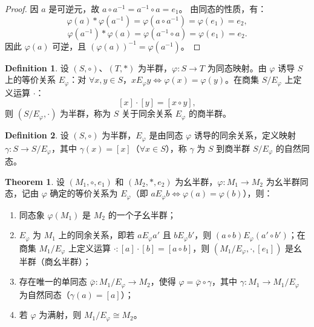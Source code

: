\documentclass[oneside]{book}
\theoremstyle{definition}
\newtheorem{definition}{Definition}[section]
\newtheorem{theorem}{Theorem}[section]
\begin{document}
\begin{proof}
	因 \( a \) 是可逆元，故 \( a \circ a^{-1} = a^{-1} \circ a = e_1 \)。
	由同态的性质，有：
	\[
	\varphi(a) * \varphi(a^{-1}) = \varphi(a \circ a^{-1}) = \varphi(e_1) = e_2,
	\]
	\[
	\varphi(a^{-1}) * \varphi(a) = \varphi(a^{-1} \circ a) = \varphi(e_1) = e_2.
	\]
	因此 \( \varphi(a) \) 可逆，且 \( (\varphi(a))^{-1} = \varphi(a^{-1}) \)。
\end{proof}

\begin{definition}
	设 \( (S, \circ) \)、\( (T, *) \) 为半群，\( \varphi: S \to T \) 为同态映射。由 \( \varphi \) 诱导 \( S \) 上的等价关系 \( E_\varphi \)：对 \( \forall x, y \in S \)，\( x E_\varphi y \iff \varphi(x) = \varphi(y) \)。在商集 \( S/E_\varphi \) 上定义运算 \( \cdot \)：
	\[
	[x] \cdot [y] = [x \circ y],
	\]
	则 \( (S/E_\varphi, \cdot) \) 为半群，称为 \( S \) 关于同余关系 \( E_\varphi \) 的商半群。
\end{definition}

\begin{definition}
	设 \( (S, \circ) \) 为半群，\( E_\varphi \) 是由同态 \( \varphi \) 诱导的同余关系，定义映射 \( \gamma: S \to S/E_\varphi \)，其中 \( \gamma(x) = [x] \)（\( \forall x \in S \)），称 \( \gamma \) 为 \( S \) 到商半群 \( S/E_\varphi \) 的自然同态。
\end{definition}

\begin{theorem}
	设 \( (M_1, \circ, e_1) \) 和 \( (M_2, *, e_2) \) 为幺半群，\( \varphi: M_1 \to M_2 \) 为幺半群同态，记由 \( \varphi \) 确定的等价关系为 \( E_\varphi \)（即 \( aE_\varphi b \iff \varphi(a) = \varphi(b) \)），则：
	\begin{enumerate}
		\item 同态象 \( \varphi(M_1) \) 是 \( M_2 \) 的一个子幺半群；
		\item \( E_\varphi \) 为 \( M_1 \) 上的同余关系，即若 \( aE_\varphi a' \) 且 \( bE_\varphi b' \)，则 \( (a \circ b)E_\varphi (a' \circ b') \)；在商集 \( M_1/E_\varphi \) 上定义运算 \( \cdot: [a] \cdot [b] = [a \circ b] \)，则 \( (M_1/E_\varphi, \cdot, [e_1]) \) 是幺半群（商幺半群）；
		\item 存在唯一的单同态 \( \bar{\varphi}: M_1/E_\varphi \to M_2 \)，使得 \( \varphi = \bar{\varphi} \circ \gamma \)，其中 \( \gamma: M_1 \to M_1/E_\varphi \) 为自然同态（\( \gamma(a) = [a] \)）；
		\item 若 \( \varphi \) 为满射，则 \( M_1/E_\varphi \cong M_2 \)。
	\end{enumerate}
\end{theorem}
\end{document}

